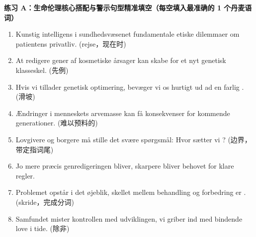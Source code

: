 
\textbf{练习 A：生命伦理核心搭配与警示句型精准填空（每空填入最准确的 1 个丹麦语词）}
\begin{enumerate}
  \item Kunstig intelligens i sundhedsvæsenet \underline{\hspace{2.2cm}} fundamentale etiske dilemmaer om patientens privatliv. (rejse，现在时)
  \item At redigere gener af kosmetiske årsager kan skabe \underline{\hspace{2.2cm}} for et nyt genetisk klasseskel. (先例)
  \item Hvis vi tillader genetisk optimering, bevæger vi os hurtigt ud ad en farlig \underline{\hspace{2.2cm}}. (滑坡)
  \item Ændringer i menneskets arvemasse kan få \underline{\hspace{2.2cm}} konsekvenser for kommende generationer. (难以预料的)
  \item Lovgivere og borgere må stille det svære spørgsmål: Hvor sætter vi \underline{\hspace{2.2cm}}? (边界，带定指词尾)
  \item Jo mere præcis genredigeringen bliver, \underline{\hspace{2.2cm}} skarpere bliver behovet for klare regler.
  \item Problemet opstår i det øjeblik, skellet mellem behandling og forbedring er \underline{\hspace{2.2cm}}. (skride，完成分词)
  \item Samfundet mister kontrollen med udviklingen, \underline{\hspace{2.2cm}} vi griber ind med bindende love i tide. (除非)
\end{enumerate}

